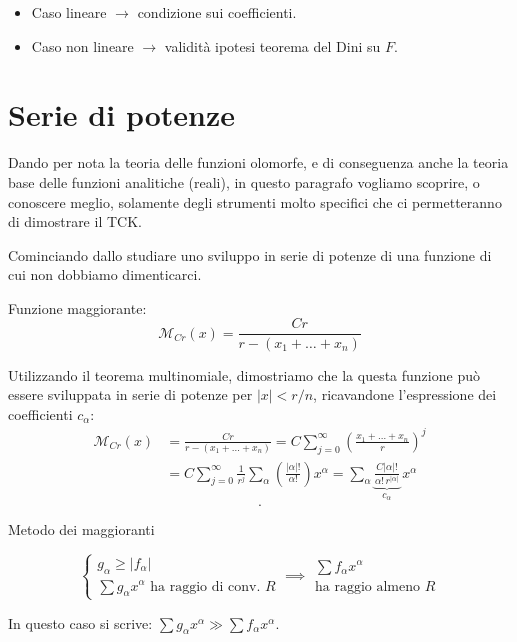 \begin{remark}
\begin{itemize}
\item Caso lineare $\rightarrow$ condizione sui coefficienti.
\item Caso non lineare $\rightarrow$ validità ipotesi teorema del Dini su $F$.
\end{itemize}
\end{remark}


\newpage
\section{Serie di potenze}
Dando per nota la teoria delle funzioni olomorfe, e di conseguenza anche la teoria base delle funzioni analitiche (reali), in questo paragrafo vogliamo scoprire, o conoscere meglio, solamente degli strumenti molto specifici che ci permetteranno di dimostrare il TCK.

Cominciando dallo studiare uno sviluppo in serie di potenze di una funzione di cui non dobbiamo dimenticarci.
\begin{definition}
Funzione maggiorante: $$\mathcal{M}_{Cr}(x)=\frac{Cr}{r-(x_1+\ldots +x_n)}$$
\end{definition}
Utilizzando il teorema multinomiale, dimostriamo che la questa funzione può essere sviluppata in serie di potenze per $|x|<r/n$, ricavandone l'espressione dei coefficienti $c_\alpha$:
\begin{align*}
\mathcal{M}_{Cr}(x) &= \frac{Cr}{r-(x_1+\ldots +x_n)} = C \sum\limits_{j=0}^\infty \left(\frac{x_1+\ldots +x_n}{r}\right)^j  \\
&= C \sum\limits_{j=0}^\infty \frac{1}{r^j} \sum\limits_\alpha \left( \frac{|\alpha |!}{\alpha !}\right)x^\alpha = \sum\limits_\alpha 
\underbrace{\frac{C|\alpha |!}{\alpha ! \, r^{|\alpha |}}}_{c_\alpha} \, x^\alpha
\end{align*}
$$.$$



Metodo dei maggioranti
\begin{theorem}
\begin{equation*}
\begin{cases}
g_\alpha \geq |f_\alpha|\\
\sum g_\alpha x^\alpha \text{ ha raggio di conv. } R
\end{cases}
\implies 
\begin{array}{c}
\sum f_\alpha x^\alpha \\
\text{ha raggio almeno } R
\end{array}
\end{equation*}
\end{theorem}
In questo caso si scrive:  $\sum g_\alpha x^\alpha \gg \sum f_\alpha x^\alpha$.



